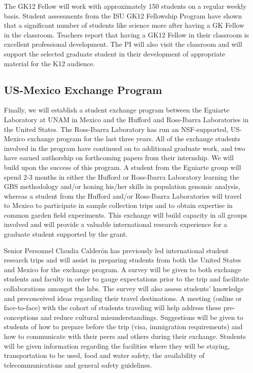 The GK12 Fellow will work with approximately 150 students on a regular weekly basis.  Student assessments from the ISU GK12 Fellowship Program have shown that a significant number of students like science more after having a GK Fellow in the classroom.  Teachers report that having a GK12 Fellow in their classroom is excellent professional development.  The PI will also visit the classroom and will support the selected graduate student in their development of appropriate material for the K12 audience.

\subsection*{US-Mexico Exchange Program}
	
Finally, we will establish a student exchange program between the Eguiarte Laboratory at UNAM in Mexico and the Hufford and Ross-Ibarra Laboratories in the United States. The Ross-Ibarra Laboratory has run an NSF-supported, US-Mexico exchange program for the last three years.  All of the exchange students involved in the program have continued on to additional graduate work, and two have earned authorship on forthcoming papers from their internship.  We will build upon the success of this program.  A student from the Eguiarte group will spend 2-3 months in either the Hufford or Ross-Ibarra Laboratory learning the GBS methodology and/or honing his/her skills in population genomic analysis, whereas a student from the Hufford and/or Ross-Ibarra Laboratories will travel to Mexico to participate in sample collection trips and to obtain expertise in common garden field experiments. This exchange will build capacity in all groups involved and will provide a valuable international research experience for a graduate student supported by the grant.  

Senior Personnel Claudia Calder\'{o}n has previously led international student research trips and will assist in preparing students from both the United States and Mexico for the exchange program. A survey will be given to both exchange students and faculty in order to gauge expectations prior to the trip and facilitate collaborations amongst the labs.  The survey will also assess students' knowledge and preconceived ideas  regarding their travel destinations.  A meeting (online or face-to-face) with the cohort of students traveling will help address these pre-conceptions and reduce cultural misunderstandings.  Suggestions will be given to students of how to prepare before the trip (visa, immigration requirements) and how to communicate with their peers and others during their exchange.  Students will be given information regarding the facilities where they will be staying, transportation to be used, food and water safety, the availability of telecommunications and general safety guidelines.

